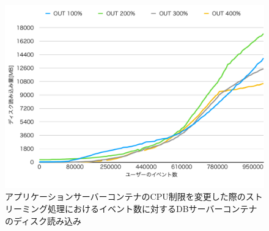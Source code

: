 \documentclass[../../../../../main]{subfiles}
\begin{document}
    \begin{figure}[H]
        \centering
        \includegraphics[width=12cm]{graph}
        \caption{アプリケーションサーバーコンテナのCPU制限を変更した際のストリーミング処理におけるイベント数に対するDBサーバーコンテナのディスク読み込み}
        \label{fig:stream-change-cpu-limit-db-disk-out-app_1024-db_1_1024}
    \end{figure}
\end{document}
